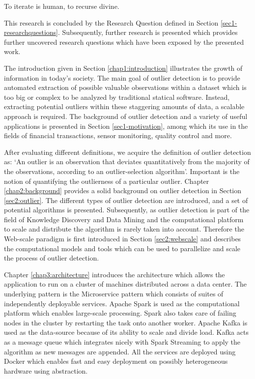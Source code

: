 \begin{savequote}[75mm] 
To iterate is human, to recurse divine.  
\end{savequote}

This research is concluded by the Research Question defined in Section \ref{sec1-researchquestions}. Subsequently, further research is presented which provides further uncovered research questions which have been exposed by the presented work.

The introduction given in Section \ref{chap1:introduction} illustrates the growth of information in today's society. The main goal of outlier detection is to provide automated extraction of possible valuable observations within a dataset which is too big or complex to be analyzed by traditional statical software. Instead, extracting potential outliers within these staggering amounts of data, a scalable approach is required. The background of outlier detection and a variety of useful applications is presented in Section \ref{sec1-motivation}, among which its use in the fields of financial transactions, sensor monitoring, quality control and more.

After evaluating different definitions, we acquire the definition of outlier detection as: `An outlier is an observation that deviates quantitatively from the majority of the observations, according to an outlier-selection algorithm'. Important is the notion of quantifying the outlierness of a particular outlier. Chapter \ref{chap2:background} provides a solid background on outlier detection in Section \ref{sec2:outlier}. The different types of outlier detection are introduced, and a set of potential algorithms is presented. Subsequently, as outlier detection is part of the field of Knowledge Discovery and Data Mining and the computational platform to scale and distribute the algorithm is rarely taken into account. Therefore the Web-scale paradigm is first introduced in Section \ref{sec2:webscale} and describes the computational models and tools which can be used  to parallelize and scale the process of outlier detection.

Chapter \ref{chap3:architecture} introduces the architecture which allows the application to run on a cluster of machines distributed across a data center. The underlying pattern is the Microservice pattern which consists of suites of independently deployable services. Apache Spark is used as the computational platform which enables large-scale processing. Spark also takes care of failing nodes in the cluster by restarting the task onto another worker. Apache Kafka is used as the data-source because of its ability to scale and divide load. Kafka acts as a message queue which integrates nicely with Spark Streaming to apply the algorithm as new messages are appended. All the services are deployed using Docker which enables fast and easy deployment on possibly heterogeneous hardware using abstraction.

